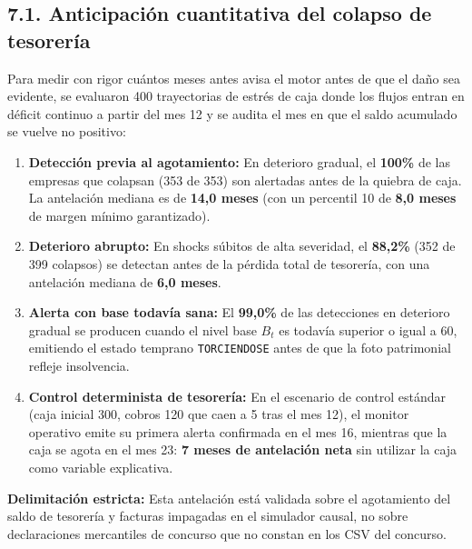 \documentclass[10pt,a4paper]{article}
\begin{document}
\subsection*{7.1. Anticipación cuantitativa del colapso de tesorería}
Para medir con rigor cuántos meses antes avisa el motor antes de que el daño sea evidente, se evaluaron 400 trayectorias de estrés de caja donde los flujos entran en déficit continuo a partir del mes 12 y se audita el mes en que el saldo acumulado se vuelve no positivo:
\begin{enumerate}[leftmargin=*, noitemsep]
  \item \textbf{Detección previa al agotamiento:} En deterioro gradual, el \textbf{100\%} de las empresas que colapsan (353 de 353) son alertadas antes de la quiebra de caja. La antelación mediana es de \textbf{14,0 meses} (con un percentil 10 de \textbf{8,0 meses} de margen mínimo garantizado).
  \item \textbf{Deterioro abrupto:} En shocks súbitos de alta severidad, el \textbf{88,2\%} (352 de 399 colapsos) se detectan antes de la pérdida total de tesorería, con una antelación mediana de \textbf{6,0 meses}.
  \item \textbf{Alerta con base todavía sana:} El \textbf{99,0\%} de las detecciones en deterioro gradual se producen cuando el nivel base $B_t$ es todavía superior o igual a 60, emitiendo el estado temprano \texttt{TORCIENDOSE} antes de que la foto patrimonial refleje insolvencia.
  \item \textbf{Control determinista de tesorería:} En el escenario de control estándar (caja inicial 300, cobros 120 que caen a 5 tras el mes 12), el monitor operativo emite su primera alerta confirmada en el mes 16, mientras que la caja se agota en el mes 23: \textbf{7 meses de antelación neta} sin utilizar la caja como variable explicativa.
\end{enumerate}
\textbf{Delimitación estricta:} Esta antelación está validada sobre el agotamiento del saldo de tesorería y facturas impagadas en el simulador causal, no sobre declaraciones mercantiles de concurso que no constan en los CSV del concurso.
\end{document}

